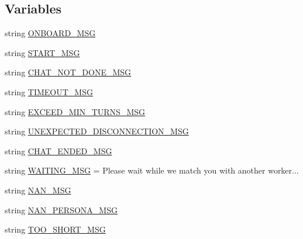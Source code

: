 \subsection*{Variables}
\begin{DoxyCompactItemize}
\item 
string \hyperlink{namespaceparlai_1_1mturk_1_1tasks_1_1convai2__model__eval_1_1worlds_ac4e8ac2c78113619ccf2cd30f6104ba9}{O\+N\+B\+O\+A\+R\+D\+\_\+\+M\+SG}
\item 
string \hyperlink{namespaceparlai_1_1mturk_1_1tasks_1_1convai2__model__eval_1_1worlds_aec213c86adf41f4fe9aba40c5f204d99}{S\+T\+A\+R\+T\+\_\+\+M\+SG}
\item 
string \hyperlink{namespaceparlai_1_1mturk_1_1tasks_1_1convai2__model__eval_1_1worlds_ac441239499c2cfd8169d5dc71b712b63}{C\+H\+A\+T\+\_\+\+N\+O\+T\+\_\+\+D\+O\+N\+E\+\_\+\+M\+SG}
\item 
string \hyperlink{namespaceparlai_1_1mturk_1_1tasks_1_1convai2__model__eval_1_1worlds_ad350ee8d0efcb86baff47a5d45c343d3}{T\+I\+M\+E\+O\+U\+T\+\_\+\+M\+SG}
\item 
string \hyperlink{namespaceparlai_1_1mturk_1_1tasks_1_1convai2__model__eval_1_1worlds_a5e21bdfb814efe46d22b8cd1b4426270}{E\+X\+C\+E\+E\+D\+\_\+\+M\+I\+N\+\_\+\+T\+U\+R\+N\+S\+\_\+\+M\+SG}
\item 
string \hyperlink{namespaceparlai_1_1mturk_1_1tasks_1_1convai2__model__eval_1_1worlds_a105defc840922f7df918fd89de03ca13}{U\+N\+E\+X\+P\+E\+C\+T\+E\+D\+\_\+\+D\+I\+S\+C\+O\+N\+N\+E\+C\+T\+I\+O\+N\+\_\+\+M\+SG}
\item 
string \hyperlink{namespaceparlai_1_1mturk_1_1tasks_1_1convai2__model__eval_1_1worlds_ad42d447733e63cc1015fe60e13410d1f}{C\+H\+A\+T\+\_\+\+E\+N\+D\+E\+D\+\_\+\+M\+SG}
\item 
string \hyperlink{namespaceparlai_1_1mturk_1_1tasks_1_1convai2__model__eval_1_1worlds_a9b429f507b5efe65f92378df0ed9e9eb}{W\+A\+I\+T\+I\+N\+G\+\_\+\+M\+SG} = \textquotesingle{}Please wait while we match you with another worker...\textquotesingle{}
\item 
string \hyperlink{namespaceparlai_1_1mturk_1_1tasks_1_1convai2__model__eval_1_1worlds_a30941c4a8072bfa76a91b9341bddef22}{N\+A\+N\+\_\+\+M\+SG}
\item 
string \hyperlink{namespaceparlai_1_1mturk_1_1tasks_1_1convai2__model__eval_1_1worlds_ab47521325f4bc4eef70e45ed8276f159}{N\+A\+N\+\_\+\+P\+E\+R\+S\+O\+N\+A\+\_\+\+M\+SG}
\item 
string \hyperlink{namespaceparlai_1_1mturk_1_1tasks_1_1convai2__model__eval_1_1worlds_ac115825a6174c99a0f225a34b2474281}{T\+O\+O\+\_\+\+S\+H\+O\+R\+T\+\_\+\+M\+SG}

\end{DoxyCompactItemize}

